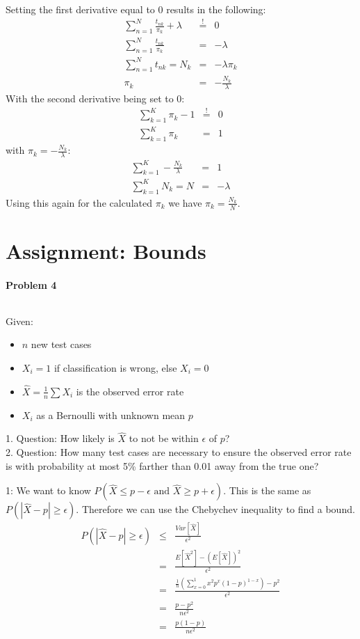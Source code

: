 \documentclass{article}
\begin{document}
Setting the first derivative equal to 0 results in the following:
\begin{eqnarray}
\sum_{n=1}^N  \frac{t_{nk}}{\pi_k} + \lambda &\overset{!}{=}& 0\\
\sum_{n=1}^N  \frac{t_{nk}}{\pi_k} &=& -\lambda\\
\sum_{n=1}^N t_{nk} = N_k &=& -\lambda \pi_k\\
\pi_k &=& -\frac{N_k}{\lambda}
\end{eqnarray}
With the second derivative being set to 0:
\begin{eqnarray}
\sum_{k=1}^K \pi_k - 1 &\overset{!}{=}& 0\\
\sum_{k=1}^K \pi_k &=& 1
\end{eqnarray}
with $\pi_k = -\frac{N_k}{\lambda}$:
\begin{eqnarray}
\sum_{k=1}^K -\frac{N_k}{\lambda} &=& 1\\
\sum_{k=1}^K N_k = N &=& -\lambda 
\end{eqnarray}
Using this again for the calculated $\pi_k$ we have $\pi_k = \frac{N_k}{N}$.


\section{Assignment: Bounds }
\paragraph*{Problem 4}
$\;$ 

Given:
\begin{itemize}
\item $n$ new test cases
\item $X_i = 1$ if classification is wrong, else $X_i = 0$
\item $\hat{X} = \frac{1}{n}\sum X_i$ is the observed error rate
\item $X_i$ as a Bernoulli with unknown mean $p$
\end{itemize}

1. Question: How likely is $\hat{X}$ to not be within $\epsilon$ of $p$?\\
2. Question: How many test cases are necessary to ensure the observed error rate is with probability at most 5\% farther than 0.01 away from the true one?

1: We want to know $P(\hat{X} \leq p-\epsilon \text{ and } \hat{X} \geq p+\epsilon)$. This is the same as $P(|\hat{X} - p| \geq \epsilon)$. Therefore we can use the Chebychev inequality to find a bound.
\begin{eqnarray}
P(|\hat{X} - p| \geq \epsilon) &\leq& \frac{Var[\hat{X}]}{\epsilon^2}\\
&=& \frac{E[\hat{X}^2]-(E[\hat{X}])^2}{\epsilon^2}\\
&=& \frac{\frac{1}{n}\left(\sum_{x=0}^1 x^2 p^x (1-p)^{1-x}\right) -p^2}{\epsilon^2}\\
&=& \frac{p - p^2}{n\epsilon^2}\\
&=& \frac{p(1-p)}{n\epsilon^2}
\end{eqnarray}
\end{document}
